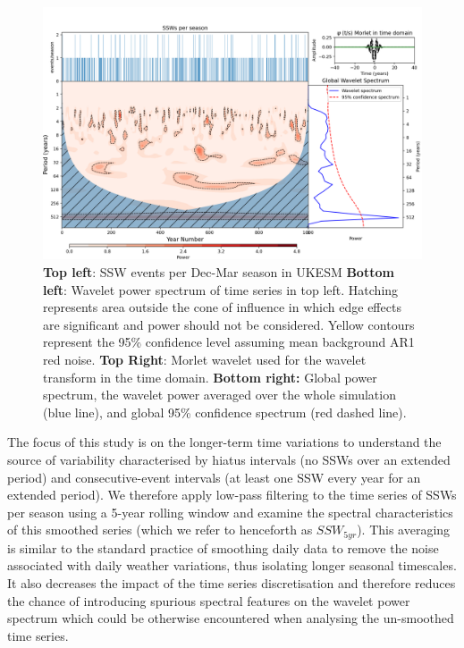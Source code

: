 \begin{figure}[h!]
\begin{center}
\noindent\includegraphics[width = 0.8\linewidth]{Figures/Figures-origins/SSW_wavelet.png}
\caption[Wavelet power spectrum for SSW time series in UKESM pi-control]{\textbf{Top left}: SSW events per Dec-Mar season in UKESM \textbf{Bottom left}: Wavelet power spectrum of time series in top left. Hatching represents area outside the cone of influence in which edge effects are significant and power should not be considered. Yellow contours represent the 95\% confidence level assuming mean background AR1 red noise. \textbf{Top Right}: Morlet wavelet used for the wavelet transform in the time domain. \textbf{Bottom right:} Global power spectrum, the wavelet power averaged over the whole simulation (blue line), and global 95\% confidence spectrum (red dashed line).}
\label{fig:SSW_series_wavelet}
\end{center}
\end{figure}


The focus of this study is on the longer-term time variations to understand the source of variability characterised by hiatus intervals (no SSWs over an extended period) and consecutive-event intervals (at least one SSW every year for an extended period). We therefore apply low-pass filtering to the time series of SSWs per season using a 5-year rolling window and examine the spectral characteristics of this smoothed series (which we refer to henceforth as $SSW_{5yr}$). This averaging is similar to the standard practice of smoothing daily data to remove the noise associated with daily weather variations, thus isolating longer seasonal timescales. It also decreases the impact of the time series discretisation and therefore reduces the chance of introducing spurious spectral features on the wavelet power spectrum which could be otherwise encountered when analysing the un-smoothed time series.  


